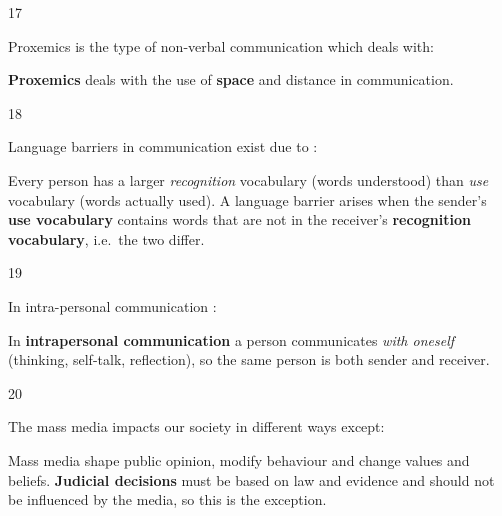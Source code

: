 \begin{question}{17}
{Proxemics is the type of non-verbal communication which deals with:\par}
\begin{explain}
\textbf{Proxemics} deals with the use of \textbf{space} and distance in communication.
\end{explain}
\end{question}

\begin{question}{18}
{Language barriers in communication exist due to :\par}
\begin{explain}
Every person has a larger \emph{recognition} vocabulary (words understood) than \emph{use} vocabulary (words actually used). A language barrier arises when the sender's \textbf{use vocabulary} contains words that are not in the receiver's \textbf{recognition vocabulary}, i.e.\ the two differ.
\end{explain}
\end{question}

\begin{question}{19}
{In intra-personal communication :\par}
\begin{explain}
In \textbf{intrapersonal communication} a person communicates \emph{with oneself} (thinking, self-talk, reflection), so the same person is both sender and receiver.
\end{explain}
\end{question}

\begin{question}{20}
{The mass media impacts our society in different ways except:\par}
\begin{explain}
Mass media shape public opinion, modify behaviour and change values and beliefs. \textbf{Judicial decisions} must be based on law and evidence and should not be influenced by the media, so this is the exception.
\end{explain}
\end{question}

